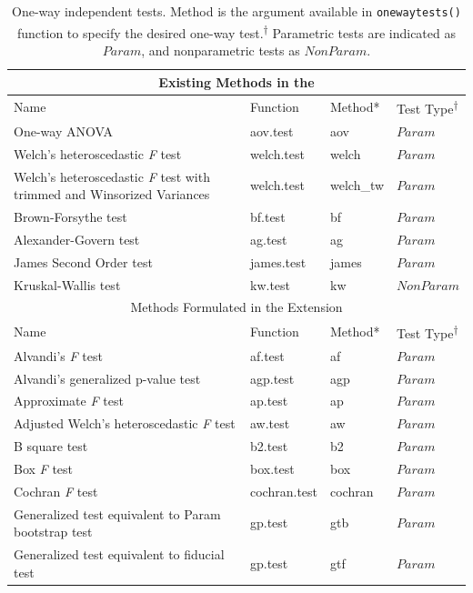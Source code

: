 \begin{table}[H]
\centering
\caption{One-way independent tests. Method is the argument available in \texttt{onewaytests()} function to specify the desired one-way test.\textsuperscript{$\dagger$} Parametric tests are indicated as \textbf{$Param$}, and nonparametric tests as \textbf{$NonParam$}.}
\begin{tabular}{p{6.5cm}lll}
\toprule
\multicolumn{4}{c}{Existing Methods in the \cite{dag2018onewaytests}} \\
\midrule
Name & Function & Method* & Test Type\textsuperscript{$\dagger$} \\ \hline
One-way ANOVA & aov.test  & aov       & \textbf{$Param$} \\
Welch's heteroscedastic \textit{F} test  & welch.test  & welch  & \textbf{$Param$} \\
Welch's heteroscedastic \textit{F} test with trimmed and Winsorized Variances & welch.test  & welch\_tw & \textbf{$Param$} \\
Brown-Forsythe test & bf.test & bf & \textbf{$Param$} \\
Alexander-Govern test  & ag.test  & ag & \textbf{$Param$} \\
James Second Order test  & james.test   & james & \textbf{$Param$} \\
Kruskal-Wallis test  & kw.test   & kw & \textbf{$NonParam$} \\
\toprule
\multicolumn{4}{c}{Methods Formulated in the Extension} \\
\midrule
Name & Function & Method* & Test Type\textsuperscript{$\dagger$} \\ \hline
Alvandi's \textit{F} test & af.test & af & \textbf{$Param$} \\
Alvandi’s generalized p-value test  & agp.test & agp & \textbf{$Param$} \\
Approximate \textit{F} test  & ap.test   & ap & \textbf{$Param$} \\
Adjusted Welch's heteroscedastic \textit{F} test & aw.test   & aw & \textbf{$Param$} \\
B square test  & b2.test   & b2 & \textbf{$Param$} \\
Box \textit{F} test  & box.test   & box & \textbf{$Param$} \\
Cochran \textit{F} test   & cochran.test  & cochran & \textbf{$Param$} \\
Generalized test equivalent to Param bootstrap test & gp.test  & gtb & \textbf{$Param$} \\
Generalized test equivalent to fiducial test  & gp.test   & gtf & \textbf{$Param$} \\

\end{tabular}
\end{table}

